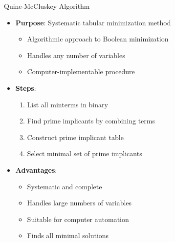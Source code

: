 \documentclass[aspectratio=169,11pt]{beamer}
\newcommand{\concept}[1]{\textbf{\color{accentcolor}#1}}
\begin{document}
\begin{frame}{Quine-McCluskey Algorithm}
\begin{itemize}
\item \concept{Purpose}: Systematic tabular minimization method
\begin{itemize}
\item Algorithmic approach to Boolean minimization
\item Handles any number of variables
\item Computer-implementable procedure
\end{itemize}
\vspace{0.5cm}
\item \concept{Steps}:
\begin{enumerate}
\item List all minterms in binary
\item Find prime implicants by combining terms
\item Construct prime implicant table
\item Select minimal set of prime implicants
\end{enumerate}
\vspace{0.3cm}
\item \concept{Advantages}:
\begin{itemize}
\item Systematic and complete
\item Handles large numbers of variables
\item Suitable for computer automation
\item Finds all minimal solutions
\end{itemize}
\end{itemize}
\end{frame}
\end{document}
